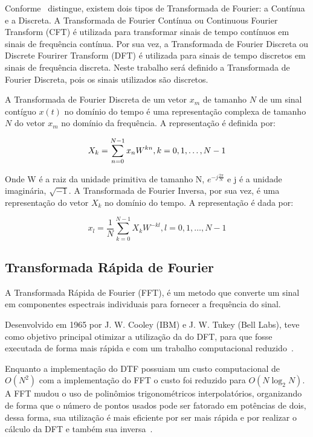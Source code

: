 \documentclass{sbrt}
\begin{document}
Conforme~\cite{richardson1978fundamentals} distingue, existem dois tipos de Transformada de Fourier: a Contínua e a
Discreta. A Transformada de Fourier Contínua ou Continuous Fourier Transform (CFT) é utilizada para transformar sinais
de tempo contínuos em sinais de frequência contínua. Por sua vez, a Transformada de Fourier Discreta ou Discrete
Fourirer Transform (DFT) é utilizada para sinais de tempo discretos em sinais de frequência discreta. Neste trabalho
será definido a Transformada de Fourier Discreta, pois os sinais utilizados são discretos.

A Transformada de Fourier Discreta de um vetor $x_m$ de tamanho $N$ de um sinal contíguo $x(t)$ no domínio do tempo é
uma representação complexa de tamanho $N$ do vetor $x_m$ no domínio da frequência. A representação é definida por:

\begin{equation} \label{eq:fourier}
  {X_k} = \sum_{n=0}^{N-1} x_n W^{kn}, k = 0, 1, \dots, N-1 \\
\end{equation}

Onde W é a raiz da unidade primitiva de tamanho N, $e^{-j \frac{2\pi}{N}}$ e j é a unidade imaginária, $\sqrt{-1}$. A
Transformada de Fourier Inversa, por sua vez, é uma representação do vetor $X_k$ no domínio do tempo. A representação é
dada por:

\begin{equation} \label{eq:fourier_inv}
  x_l = \frac{1}{N} \sum_{k=0}^{N-1} {X_k} W^{-kl}, l = 0, 1, \dots, N-1
\end{equation}

\subsection{Transformada Rápida de Fourier}

A Transformada Rápida de Fourier (FFT), é um metodo que  converte um sinal em componentes espectrais individuais para
fornecer a frequência do sinal.

Desenvolvido em 1965 por  J. W. Cooley (IBM) e J. W. Tukey (Bell Labs), teve como objetivo principal otimizar a
utilização da do DFT, para que fosse executada de forma mais rápida e com um trabalho computacional
reduzido~\cite{martins2016analise}.

Enquanto a implementação do DTF possuiam um custo computacional de $O(N^2)$ com a implementação do FFT o custo foi
reduzido para $O(N \log_2{N})$. A FFT mudou o uso de polinômios trigonométricos interpolatórios, organizando de forma
que o número de pontos usados pode ser fatorado em potências de dois, dessa forma, sua utilização é mais eficiente por
ser mais rápida e por realizar o cálculo da DFT e também sua inversa~\cite{reis2008implementaccao}.
\end{document}
